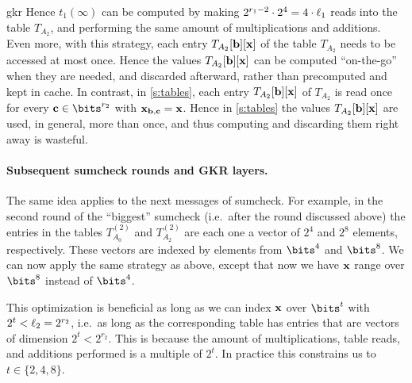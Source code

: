 \begin{lncsappendix}{gkr}
Hence $t_1(\infty)$ can be computed by making $2^{r_1 -2} \cdot 2^{4} = 4 \cdot \ell_1$ reads into the table $T_{A_2}$, and performing the same amount of multiplications and additions. Even more, with this strategy, each entry $T_{A_2}[\mathbf{b}][\mathbf{x}]$ of the table $T_{A_2}$ needs to be accessed at most once. Hence the values $T_{A_2}[\mathbf{b}][\mathbf{x}]$ can be computed ``on-the-go'' when they are needed, and discarded afterward, rather than precomputed and kept in cache. In contrast, in \cref{s:tables}, each entry $T_{A_2}[\mathbf{b}][\mathbf{x}]$ of $T_{A_2}$ is read once for every  $\cc\in \bits^{r_2}$ with $\mathbf{x}_{\mathbf{b},\mathbf{c}}=\mathbf{x}$. Hence in \cref{s:tables} the values $T_{A_2}[\mathbf{b}][\mathbf{x}]$ are used, in general, more than once, and thus   computing and discarding them right away is wasteful. 



\paragraph{Subsequent sumcheck rounds and GKR layers.} The same idea applies to the next messages of sumcheck. For example, in the second round of the ``biggest'' sumcheck (i.e.\ after the round discussed above) the entries in the tables $T_{A_0}^{(2)}$ and $T_{A_2}^{(2)}$ are  each one a vector of $2^4$ and $2^8$ elements, respectively. These vectors are indexed by elements from $\bits^4$ and $\bits^8$. We can now apply the same strategy as above, except that now we have $\mathbf{x}$ range over $\bits^8$ instead of $\bits^4$. 


This optimization is beneficial as long as we can index $\mathbf{x}$ over $\bits^{t}$ with $2^t< \ell_2=2^{r_2}$, i.e.\  as long as the corresponding table has entries that are vectors of dimension $2^t<2^{r_2}$. This is because the amount of multiplications, table reads, and additions performed is a multiple of $2^t$. In practice this constrains us to $t\in \{2,4,8\}$.






\end{lncsappendix}
